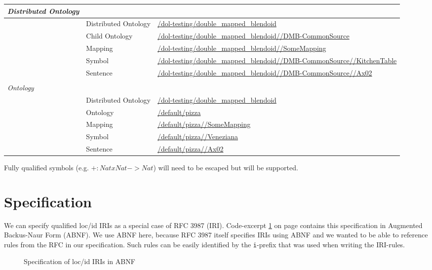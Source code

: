 \documentclass[a4paper,11pt,DIV=22]{scrartcl}
\begin{document}
\begin{tabularx}{\textwidth}{p{}p{}p{}}
  \emph{Distributed Ontology} & & \\
  \hline
  & Distributed Ontology & \url{/dol-testing/double_mapped_blendoid}\\
  & Child Ontology & \url{/dol-testing/double_mapped_blendoid//DMB-CommonSource}\\
  & Mapping & \url{/dol-testing/double_mapped_blendoid//SomeMapping}\\
  & Symbol & \url{/dol-testing/double_mapped_blendoid//DMB-CommonSource//KitchenTable}\\
  & Sentence & \url{/dol-testing/double_mapped_blendoid//DMB-CommonSource//Ax02}\\
  & & \\
  \emph{Ontology} & & \\
  \hline
  & Distributed Ontology & \url{/dol-testing/double_mapped_blendoid}\\
  & Ontology & \url{/default/pizza}\\
  & Mapping & \url{/default/pizza//SomeMapping}\\
  & Symbol & \url{/default/pizza//Veneziana}\\
  & Sentence & \url{/default/pizza//Ax02}\\
\end{tabularx}

Fully qualified symbols (e.g. $+:NatxNat->Nat$) will need to be escaped
but will be supported.

\section{Specification}

We can specify qualified loc/id IRIs as a special case of RFC 3987 (IRI).
Code-excerpt \ref{lst:loc-id-spec} on page \pageref{lst:loc-id-spec} contains this
specification in Augmented Backus-Naur Form (ABNF). We use ABNF here, because
RFC 3987 itself specifies IRIs using ABNF and we wanted to be able to reference
rules from the RFC in our specification. Such rules can be easily identified
by the \texttt{i}-prefix that was used when writing the IRI-rules.

\begin{figure}[b]
  \centering
  
  \caption[loc/id specification in ABNF]
   {Specification of loc/id IRIs in ABNF}
  \label{lst:loc-id-spec}
\end{figure}
\end{document}
